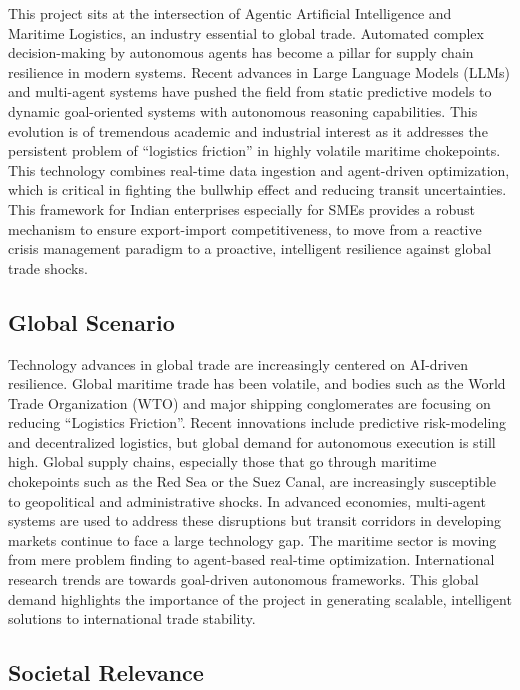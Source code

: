 This project sits at the intersection of Agentic Artificial Intelligence and Maritime Logistics, an industry essential to global trade. Automated complex decision-making by autonomous agents has become a pillar for supply chain resilience in modern systems. Recent advances in Large Language Models (LLMs) and multi-agent systems have pushed the field from static predictive models to dynamic goal-oriented systems with autonomous reasoning capabilities. This evolution is of tremendous academic and industrial interest as it addresses the persistent problem of “logistics friction” in highly volatile maritime chokepoints. This technology combines real-time data ingestion and agent-driven optimization, which is critical in fighting the bullwhip effect and reducing transit uncertainties. This framework for Indian enterprises especially for SMEs provides a robust mechanism to ensure export-import competitiveness, to move from a reactive crisis management paradigm to a proactive, intelligent resilience against global trade shocks.

\subsection[Global Scenario]{\textbf{Global Scenario}}

Technology advances in global trade are increasingly centered on AI-driven resilience. Global maritime trade has been volatile, and bodies such as the World Trade Organization (WTO) and major shipping conglomerates are focusing on reducing “Logistics Friction”. Recent innovations include predictive risk-modeling and decentralized logistics, but global demand for autonomous execution is still high. Global supply chains, especially those that go through maritime chokepoints such as the Red Sea or the Suez Canal, are increasingly susceptible to geopolitical and administrative shocks. In advanced economies, multi-agent systems are used to address these disruptions but transit corridors in developing markets continue to face a large technology gap. The maritime sector is moving from mere problem finding to agent-based real-time optimization. International research trends are towards goal-driven autonomous frameworks. This global demand highlights the importance of the project in generating scalable, intelligent solutions to international trade stability.

\subsection[Societal Relevance]{\textbf{Societal Relevance}}

